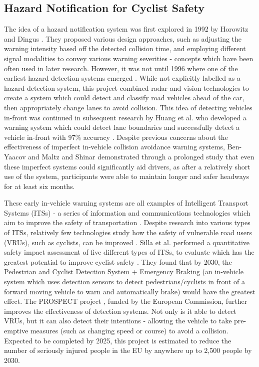 \documentclass{interim}
\begin{document}
\subsection{Hazard Notification for Cyclist Safety}
The idea of a hazard notification system was first explored in 1992 by Horowitz and Dingus \cite{doi:10.1177/154193129203601320}. They proposed various design approaches, such as adjusting the warning intensity based off the detected collision time, and employing different signal modalities to convey various warning severities - concepts which have been often used in later research. However, it was not until 1996 where one of the earliest hazard detection systems emerged \cite{566402}. While not explicitly labelled as a hazard detection system, this project combined radar and vision technologies to create a system which could detect and classify road vehicles ahead of the car, then appropriately change lanes to avoid collision. This idea of detecting vehicles in-front was continued in subsequent research by Huang et al. who developed a warning system which could detect lane boundaries and successfully detect a vehicle in-front with 97\% accuracy \cite{1307429}. Despite previous concerns about the effectiveness of imperfect in-vehicle collision avoidance warning systems, Ben-Yaacov \cite{doi:10.1518/0018720024497925} and Maltz and Shinar \cite{doi:10.1518/hfes.46.2.357.37348} demonstrated through a prolonged study that even these imperfect systems could significantly aid drivers, as after a relatively short use of the system, participants were able to maintain longer and safer headways for at least six months.

These early in-vehicle warning systems are all examples of Intelligent Transport Systems (ITSs) - a series of information and communications technologies which aim to improve the safety of transportation \cite{its}. Despite research into various types of ITSs, relatively few technologies study how the safety of vulnerable road users (VRUs), such as cyclists, can be improved \cite{Scholliers2017}. Silla et al. performed a quantitative safety impact assessment of five different types of ITSs, to evaluate which has the greatest potential to improve cyclist safety \cite{SILLA2017134}. They found that by 2030, the Pedestrian and Cyclist Detection System + Emergency Braking (an in-vehicle system which uses detection sensors to detect pedestrians/cyclists in front of a forward moving vehicle to warn and automatically brake) would have the greatest effect. The PROSPECT project \cite{cieslik2019improving}, funded by the European Commission, further improves the effectiveness of detection systems. Not only is it able to detect VRUs, but it can also detect their intentions - allowing the vehicle to take pre-emptive measures (such as changing speed or course) to avoid a collision. Expected to be completed by 2025, this project is estimated to reduce the number of seriously injured people in the EU by anywhere up to 2,500 people by 2030.
\end{document}
